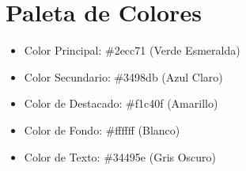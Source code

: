 \section*{Paleta de Colores}
\begin{itemize}
  \item Color Principal: \#2ecc71 (Verde Esmeralda)
  \item Color Secundario: \#3498db (Azul Claro)
  \item Color de Destacado: \#f1c40f (Amarillo)
  \item Color de Fondo: \#ffffff (Blanco)
  \item Color de Texto: \#34495e (Gris Oscuro)
\end{itemize}